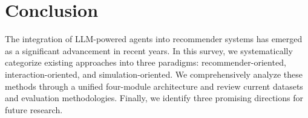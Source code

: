 \section{Conclusion}

The integration of LLM-powered agents into recommender systems has emerged as a significant advancement in recent years. 
In this survey, we systematically categorize existing approaches into three paradigms: recommender-oriented, interaction-oriented, and simulation-oriented. 
We comprehensively analyze these methods through a unified four-module architecture and review current datasets and evaluation methodologies.
Finally, we identify three promising directions for future research.